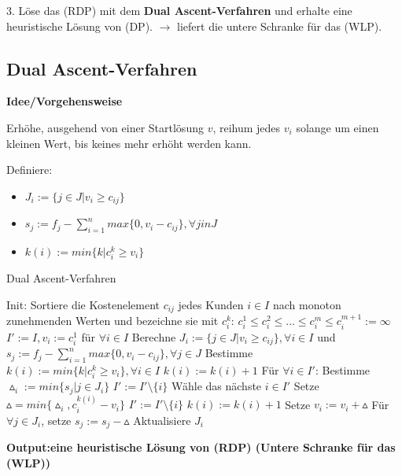       \par 3. Löse das (RDP) mit dem \textbf{Dual Ascent-Verfahren} und erhalte eine heuristische Lösung von (DP). $\rightarrow$ liefert die untere Schranke für das (WLP).

      \subsection{Dual Ascent-Verfahren} %
      \label{sub:dual_ascent_verfahren}

        \par \textbf{Idee/Vorgehensweise}
        \par Erhöhe, ausgehend von einer Startlösung $v$, reihum jedes $v_i$ solange um einen kleinen Wert, bis keines mehr erhöht werden kann.

        \par Definiere:
        \begin{itemize}
          \item $J_i := \{j \in J | v_i \geq c_{ij}\}$
          \item $s_j := f_j - \sum_{i = 1}^{n}max\{0, v_i - c_{ij}\}, \forall j in J$
          \item $k(i) := min\{k|c_i^k \geq v_i\}$
        \end{itemize}

        \begin{algorithm}[H]
          \begin{algorithmic}[1]
            \caption{Dual Ascent-Verfahren}
            \State Init:
            \State Sortiere die Kostenelement $c_{ij}$ jedes Kunden $i \in I$ nach monoton zunehmenden Werten und bezeichne sie mit $c_i^k$: $c_i^1 \leq c_i^2 \leq \dots \leq c_i^m \leq c_i^{m+1}:= \infty$
            \State $I':= I, v_i := c_i^1$ für $\forall i \in I$
            \State Berechne $J_i := \{j \in J | v_i \geq c_{ij}\}, \forall i \in I$ und  $s_j := f_j - \sum_{i = 1}^{n}max\{0, v_i - c_{ij}\}, \forall j \in J$
            \State Bestimme $k(i) := min\{k|c_i^k \geq v_i\}, \forall i \in I$
              \State $k(i) := k(i) + 1$
            \EndIf
              \State Für $\forall i \in I'$: Bestimme $\vartriangle_i := min\{s_j|j \in J_i\}$
                \State $I':=I' \setminus \{i\}$
                \State Wähle das nächste $i \in I'$
              \Else
                \State Setze $\vartriangle = min\{\vartriangle_i, c_i^{k(i)} - v_i\}$
                  \State $I' := I' \setminus \{i\}$
                \Else 
                  \State $k(i) := k(i) + 1$
                \EndIf
                \State Setze $v_i := v_i + \vartriangle$ 
                \State Für $\forall j \in J_i$, setze $s_j := s_j - \vartriangle$
                \State Aktualisiere $J_i$
              \EndIf
            \EndWhile
            \end{algorithmic}
          \textbf{Output:eine heuristische Lösung von (RDP) (Untere Schranke für das (WLP))} 
        \end{algorithm}


